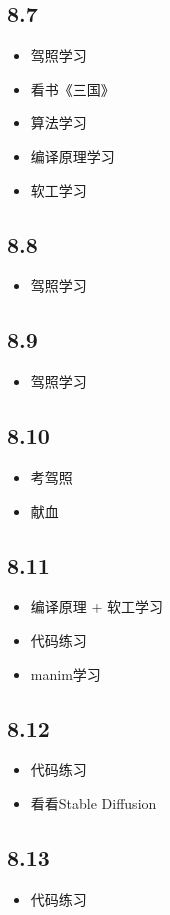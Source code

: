 \documentclass[UTF8]{ctexart}
\begin{document}
\subsection*{8.7}
\begin{itemize}
    \item 驾照学习
    \item 看书《三国》
    \item 算法学习
    \item 编译原理学习
    \item 软工学习
\end{itemize}
\subsection*{8.8}
\begin{itemize}
    \item 驾照学习
\end{itemize}
\subsection*{8.9}
\begin{itemize}
    \item 驾照学习
\end{itemize}
\subsection*{8.10}
\begin{itemize}
    \item 考驾照
    \item 献血
\end{itemize}
\subsection*{8.11}
\begin{itemize}
    \item 编译原理 + 软工学习
    \item 代码练习
    \item manim学习
\end{itemize}
\subsection*{8.12}
\begin{itemize}
    \item 代码练习
    \item 看看Stable Diffusion
\end{itemize}
\subsection*{8.13}
\begin{itemize}
    \item 代码练习
\end{itemize}
\end{document}
